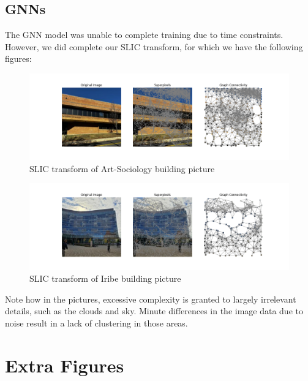 \documentclass{article}
\begin{document}
\subsection{GNNs}

The GNN model was unable to complete training due to time constraints. However, we did complete our SLIC transform, for which we have the following figures:

\begin{figure}[H]
    \centering
    \includegraphics[width=0.8\linewidth]{slic_1.png}
    \caption{SLIC transform of Art-Sociology building picture}
    \label{fig:slic1}
\end{figure}

\begin{figure}[H]
    \centering
    \includegraphics[width=0.8\linewidth]{slic_2.png}
    \caption{SLIC transform of Iribe building picture}
    \label{fig:slic2}
\end{figure}

Note how in the pictures, excessive complexity is granted to largely irrelevant details, such as the clouds and sky. Minute differences in the image data due to noise result in a lack of clustering in those areas. 

\section{Extra Figures}
\label{extra_figures}


\medskip


\small




\end{document}
